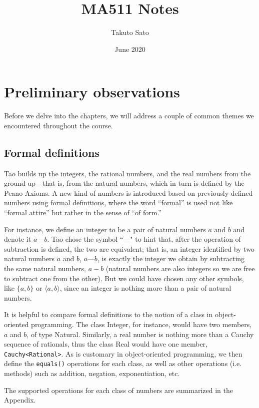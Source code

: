 \documentclass{article}
\title{MA511 Notes}
\author{Takuto Sato}
\date{June 2020}
\begin{document}
\maketitle

\section*{Preliminary observations}
Before we delve into the chapters, we will address a couple of common themes we encountered throughout the course.

\subsection*{Formal definitions}
Tao builds up the integers, the rational numbers, and the real numbers from the ground up---that is, from the natural numbers, which in turn is defined by the Peano Axioms. A new kind of numbers is introduced based on previously defined numbers using formal definitions, where the word ``formal'' is used not like ``formal attire'' but rather in the sense of ``of form.''

For instance, we define an integer to be a pair of natural numbers $a$ and $b$ and denote it $a$---$b$. Tao chose the symbol ``---" to hint that, after the operation of subtraction is defined, the two are equivalent; that is, an integer identified by two natural numbers $a$ and $b$, $a$---$b$, is exactly the integer we obtain by subtracting the same natural numbers, $a-b$ (natural numbers are also integers so we are free to subtract one from the other). But we could have chosen any other symbols, like $\{a,b\}$ or $\langle a,b \rangle$, since an integer is nothing more than a pair of natural numbers. 

It is helpful to compare formal definitions to the notion of a class in object-oriented programming. The class Integer, for instance, would have two members, $a$ and $b$, of type Natural. Similarly, a real number is nothing more than a Cauchy sequence of rationals, thus the class Real would have one member, \lstinline{Cauchy<Rational>}. As is customary in object-oriented programming, we then define the \lstinline{equals()} operations for each class, as well as other operations (i.e. methods) such as addition, negation, exponentiation, etc.

The supported operations for each class of numbers are summarized in the Appendix.
\end{document}
